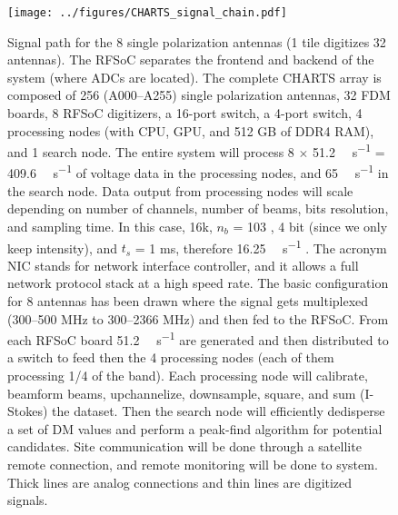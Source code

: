 \begin{figure}
    \centering
    \texttt{[image: ../figures/CHARTS\_signal\_chain.pdf]}
    \caption[CHARTS signal chain]{Signal path for the 8 single polarization antennas (1 tile digitizes 32 antennas). The RFSoC separates the frontend and backend of the
    system (where ADCs are located). The complete CHARTS array is composed of 256 (A000–A255) single polarization antennas, 32 FDM boards, 8 RFSoC digitizers, a 16-port switch, a 4-port switch, 4 processing nodes (with CPU, GPU, and 512 GB of DDR4 RAM), and 1
    search node. The entire system will process 8 $\times$ 51.2 \si{\giga\bit\per\second} = 409.6 \si{\giga\bit\per\second} of voltage data in the processing nodes, and 65 \si{\giga\bit\per\second}
    in the
    search node. Data output from processing nodes will scale depending on number of channels, number of beams, bits resolution, and sampling
    time. In this case, 16k, $n_b$ = 103
    , 4 bit (since we only keep intensity), and $t_s$ = 1 ms, therefore 16.25 \si{\giga\bit\per\second}
    . The acronym NIC stands for network
    interface controller, and it allows a full network protocol stack at a high speed rate. The basic configuration for 8 antennas has been drawn where
    the signal gets multiplexed (300–500 MHz to 300–2366 MHz) and then fed to the RFSoC. From each RFSoC board 51.2 \si{\giga\bit\per\second}
    are generated
    and then distributed to a switch to feed then the 4 processing nodes (each of them processing 1/4 of the band). Each processing node will calibrate,
    beamform beams, upchannelize, downsample, square, and sum (I-Stokes) the dataset. Then the search node will efficiently dedisperse a set of DM
    values and perform a peak-find algorithm for potential candidates. Site communication will be done through a satellite remote connection, and
    remote monitoring will be done to system. Thick lines are analog connections and thin lines are digitized signals.}
  \end{figure}
